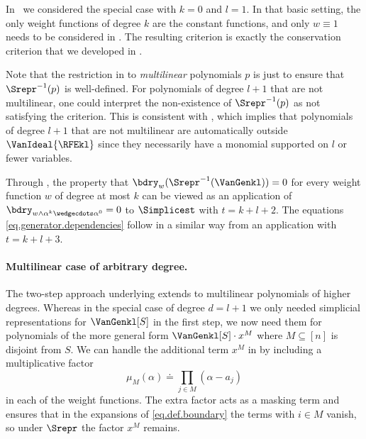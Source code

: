 In~ we considered the special case with $k=0$ and $l=1$. In that basic setting, the only weight functions of degree $k$ are the constant functions, and only $w \equiv 1$ needs to be considered in . The resulting criterion is exactly the conservation criterion that we developed in .

Note that the restriction in  to \emph{multilinear} polynomials $p$ is just to ensure that $\Srepr^{-1}(p)$ is well-defined. For polynomials of degree $l+1$ that are not multilinear, one could interpret the non-existence of $\Srepr^{-1}(p)$ as not satisfying the criterion. This is consistent with , which implies that polynomials of degree $l+1$ that are not multilinear are automatically outside \(\VanIdeal{\RFEkl}\) since they necessarily have a monomial supported on $l$ or fewer variables.

Through , the property that $\bdry_w(\Srepr^{-1}(\VanGenkl)) = 0$ for every weight function $w$ of degree at most $k$ can be viewed as an application of $\bdry_{w \wedge \alpha^k \wedgecdots \alpha^0} = 0$ to $\Simplicest$ with $t = k+l+2$. The equations \eqref{eq.generator.dependencies} follow in a similar way from an application with $t = k+l+3$.

\paragraph{Multilinear case of arbitrary degree.}
The two-step approach underlying  extends to multilinear polynomials of higher degrees. Whereas in the special case of degree $d=l+1$ we only needed simplicial representations for $\VanGenkl[S]$ in the first step, we now need them for polynomials of the more general form $\VanGenkl[S]\cdot x^M$ where $M \subseteq [n]$ is disjoint from $S$. We can handle the additional term $x^M$ in  by including a multiplicative factor 
\begin{equation}\label{eq.mu}
\mu_M(\alpha) \doteq \prod_{j \in M}(\alpha - a_j)
\end{equation}
in each of the weight functions. The extra factor acts as a masking term and ensures that in the expansions of \eqref{eq.def.boundary} the terms with $i \in M$ vanish, so under $\Srepr$ the factor $x^M$ remains. 


